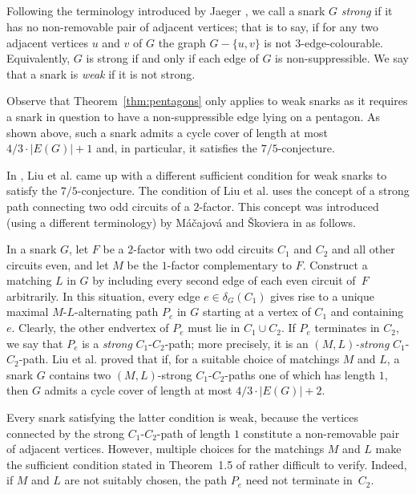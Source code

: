 \documentclass[a4paper]{amsart}
\theoremstyle{plain}
\theoremstyle{definition}
\begin{document}
\subsection{}
Following the terminology introduced by Jaeger
\cite{Jae-strong}, we call a snark $G$ \emph{strong} if it has
no non-removable pair of adjacent vertices; that is to say, if
for any two adjacent vertices $u$ and $v$ of $G$ the graph
$G-\{u,v\}$ is not $3$-edge-colourable. Equivalently, $G$ is
strong if and only if each edge of $G$ is non-suppressible. We
say that a snark is \emph{weak} if it is not strong.

Observe that Theorem~\ref{thm:pentagons} only applies to weak
snarks as  it requires a snark in question to have a
non-suppressible edge lying on a pentagon. As shown above, such
a snark admits a cycle cover of length at most
$4/3\cdot|E(G)|+1$ and, in particular, it satisfies the
$7/5$-conjecture.

In \cite[Theorem~1.5]{LHLZ}, Liu et al. came up with a
different sufficient condition for weak snarks to satisfy the
$7/5$-conjecture. The condition of Liu et al. uses the concept
of a strong path connecting two odd circuits of a $2$-factor.
This concept was introduced (using a different terminology) by
M\'a\v cajov\'a and \v Skoviera in \cite{MS-Comb} as follows.

In a snark $G$, let $F$ be a $2$-factor with two odd circuits
$C_1$ and $C_2$ and all other circuits even, and let $M$ be the
$1$-factor complementary to $F$. Construct a matching $L$ in
$G$ by including every second edge of each even circuit of~$F$
arbitrarily. In this situation, every edge $e\in\delta_G(C_1)$
gives rise to a unique maximal $M$-$L$-alternating path $P_e$
in $G$ starting at a vertex of $C_1$ and containing $e$.
Clearly, the other endvertex of $P_e$ must lie in $C_1\cup
C_2$. If $P_e$ terminates in $C_2$, we say that $P_e$ is a
\emph{strong} $C_1$-$C_2$-path; more precisely, it is an
\emph{$(M,L)$-strong} $C_1$-$C_2$-path. Liu et al. \cite{LHLZ}
proved that if, for a suitable choice of matchings $M$ and $L$,
a snark $G$ contains two $(M,L)$-strong $C_1$-$C_2$-paths one
of which has length $1$, then $G$ admits a cycle cover of
length at most $4/3\cdot|E(G)|+2$.

Every snark satisfying the latter condition is weak, because
the vertices connected by the strong $C_1$-$C_2$-path of length
$1$ constitute a non-removable pair of adjacent vertices.
However, multiple choices for the matchings $M$ and $L$ make
the sufficient condition stated in Theorem~1.5 of \cite{LHLZ}
rather difficult to verify. Indeed, if $M$ and $L$ are not
suitably chosen, the path $P_e$ need not terminate in~$C_2$.
\end{document}
